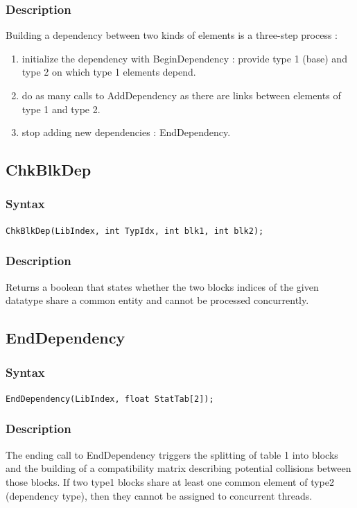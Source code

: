 \documentclass[a4paper,12pt]{article}
\begin{document}
\subsubsection*{Description}
Building a dependency between two kinds of elements is a three-step process :

\begin{enumerate}
	\item initialize the dependency with BeginDependency : provide type 1 (base) and type 2 on which type 1 elements depend.
	\item do as many calls to AddDependency as there are links between elements of type 1 and type 2.
	\item stop adding new dependencies : EndDependency.
\end{enumerate}


\subsection{ChkBlkDep}

\subsubsection*{Syntax}
\tt{ChkBlkDep(LibIndex, int TypIdx, int blk1, int blk2);}
\normalfont

\subsubsection*{Description}
Returns a boolean that states whether the two blocks indices of the given datatype share a common entity and cannot be processed concurrently.


\subsection{EndDependency}

\subsubsection*{Syntax}
\tt{EndDependency(LibIndex, float StatTab[2]);}
\normalfont

\subsubsection*{Description}
\label{collisions}

The ending call to EndDependency triggers the splitting of table 1 into blocks and the building of a compatibility matrix describing potential collisions between those blocks. If two type1 blocks share at least one common element of type2 (dependency type), then they cannot be assigned to concurrent threads.
\end{document}
